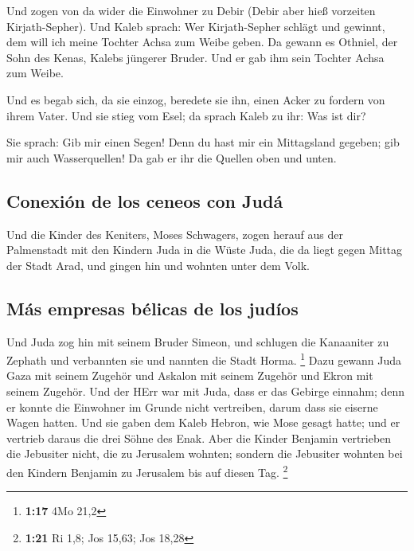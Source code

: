  Und zogen von da wider die Einwohner zu Debir (Debir
aber hieß vorzeiten Kirjath-Sepher).  Und Kaleb sprach:
Wer Kirjath-Sepher schlägt und gewinnt, dem will ich meine Tochter Achsa
zum Weibe geben.  Da gewann es Othniel, der Sohn des
Kenas, Kalebs jüngerer Bruder. Und er gab ihm sein Tochter Achsa zum
Weibe.

 Und es begab sich, da sie einzog, beredete sie ihn,
einen Acker zu fordern von ihrem Vater. Und sie stieg vom Esel; da
sprach Kaleb zu ihr: Was ist dir?

 Sie sprach: Gib mir einen Segen! Denn du hast mir ein
Mittagsland gegeben; gib mir auch Wasserquellen! Da gab er ihr die
Quellen oben und unten.

\hypertarget{conexiuxf3n-de-los-ceneos-con-juduxe1}{%
\subsection{Conexión de los ceneos con
Judá}\label{conexiuxf3n-de-los-ceneos-con-juduxe1}}

 Und die Kinder des Keniters, Moses Schwagers, zogen
herauf aus der Palmenstadt mit den Kindern Juda in die Wüste Juda, die
da liegt gegen Mittag der Stadt Arad, und gingen hin und wohnten unter
dem Volk.

\hypertarget{muxe1s-empresas-buxe9licas-de-los-juduxedos}{%
\subsection{Más empresas bélicas de los
judíos}\label{muxe1s-empresas-buxe9licas-de-los-juduxedos}}

 Und Juda zog hin mit seinem Bruder Simeon, und schlugen
die Kanaaniter zu Zephath und verbannten sie und nannten die Stadt
Horma. \footnote{\textbf{1:17} 4Mo 21,2}  Dazu gewann
Juda Gaza mit seinem Zugehör und Askalon mit seinem Zugehör und Ekron
mit seinem Zugehör.  Und der HErr war mit Juda, dass er
das Gebirge einnahm; denn er konnte die Einwohner im Grunde nicht
vertreiben, darum dass sie eiserne Wagen hatten.  Und sie
gaben dem Kaleb Hebron, wie Mose gesagt hatte; und er vertrieb daraus
die drei Söhne des Enak.  Aber die Kinder Benjamin
vertrieben die Jebusiter nicht, die zu Jerusalem wohnten; sondern die
Jebusiter wohnten bei den Kindern Benjamin zu Jerusalem bis auf diesen
Tag. \footnote{\textbf{1:21} Ri 1,8; Jos 15,63; Jos 18,28}

